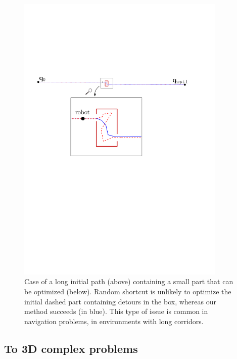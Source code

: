 \documentclass{tADR2e}
\begin{document}
\begin{figure}
	\centering
	\includegraphics[width=10cm]{local_box_optim.pdf}
	\caption{Case of a long initial path (above) containing a small part 
	that can 
	be optimized (below). Random shortcut is unlikely to optimize the initial 
	dashed part containing detours in the box, whereas our method 
	succeeds (in blue). This type of issue is common in navigation problems, in 
	environments with long corridors.}
	\label{local_box_optim}
\end{figure}



\subsection{To 3D complex problems}
\end{document}
